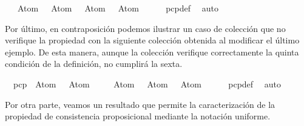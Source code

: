 \begin{isabellebody}
\ \ {\isacharbraceleft}{\isacharparenleft}{\isacharparenleft}\isactrlbold {\isasymnot}\ {\isacharparenleft}Atom\ {}{\isacharparenright}{\isacharparenright}\ \isactrlbold {\isasymrightarrow}\ Atom\ {}{\isacharparenright}{\isacharcomma}\ \isactrlbold {\isasymnot}{\isacharparenleft}\isactrlbold {\isasymnot}\ {\isacharparenleft}Atom\ {}{\isacharparenright}{\isacharparenright}{\isacharcomma}\ \ Atom\ {}{\isacharbraceright}{\isacharbraceright}{\isachardoublequoteclose}\ \isanewline
%
\isadelimproof
\ \ %
\endisadelimproof
%
\isatagproof
{}\isamarkupfalse%
\ pcp{\isacharunderscore}def\ \isamarkupfalse%
\ auto%
\endisatagproof
{\isafoldproof}%
%
\isadelimproof
%
\endisadelimproof
%
\begin{isamarkuptext}%
Por último, en contraposición podemos ilustrar un caso de colección que no verifique la 
  propiedad con la siguiente colección obtenida al modificar el último ejemplo. De
  esta manera, aunque la colección verifique correctamente la quinta condición de la
  definición, no cumplirá la sexta.%
\end{isamarkuptext}\isamarkuptrue%
\isamarkupfalse%
\ {\isachardoublequoteopen}{\isasymnot}\ pcp\ {\isacharbraceleft}{\isacharbraceleft}{\isacharparenleft}\isactrlbold {\isasymnot}\ {\isacharparenleft}Atom\ {}{\isacharparenright}{\isacharparenright}\ \isactrlbold {\isasymrightarrow}\ Atom\ {}{\isacharbraceright}{\isacharcomma}\isanewline
\ \ \ {\isacharbraceleft}{\isacharparenleft}{\isacharparenleft}\isactrlbold {\isasymnot}\ {\isacharparenleft}Atom\ {}{\isacharparenright}{\isacharparenright}\ \isactrlbold {\isasymrightarrow}\ Atom\ {}{\isacharparenright}{\isacharcomma}\ \isactrlbold {\isasymnot}{\isacharparenleft}\isactrlbold {\isasymnot}\ {\isacharparenleft}Atom\ {}{\isacharparenright}{\isacharparenright}{\isacharbraceright}{\isacharbraceright}{\isachardoublequoteclose}\ \isanewline
%
\isadelimproof
\ \ %
\endisadelimproof
%
\isatagproof
{}\isamarkupfalse%
\ pcp{\isacharunderscore}def\ \isamarkupfalse%
\ auto%
\endisatagproof
{\isafoldproof}%
%
\isadelimproof
%
\endisadelimproof
%
\begin{isamarkuptext}%
Por otra parte, veamos un resultado que permite la caracterización de la 
  propiedad de consistencia proposicional mediante la notación uniforme.


\end{isamarkuptext}
\end{isabellebody}
